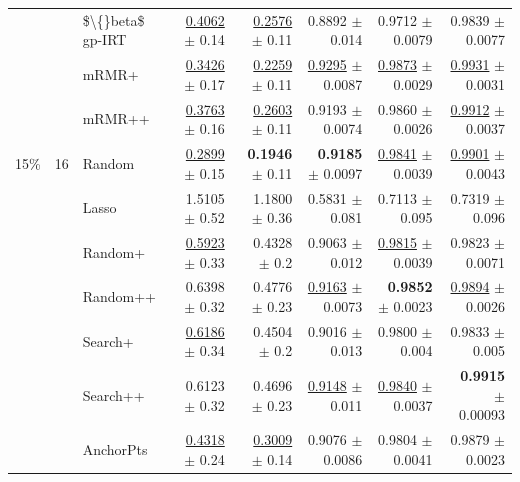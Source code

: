 \begin{longtable}{llp{}rrrrr}
 &  & \$\textbackslash\{\}beta\$ gp-IRT & \underline{0.4062} {\scriptsize $\pm$ 0.14} & \underline{0.2576} {\scriptsize $\pm$ 0.11} & 0.8892 {\scriptsize $\pm$ 0.014} & 0.9712 {\scriptsize $\pm$ 0.0079} & 0.9839 {\scriptsize $\pm$ 0.0077} \\
 &  & mRMR+ & \underline{0.3426} {\scriptsize $\pm$ 0.17} & \underline{0.2259} {\scriptsize $\pm$ 0.11} & \underline{0.9295} {\scriptsize $\pm$ 0.0087} & \underline{0.9873} {\scriptsize $\pm$ 0.0029} & \underline{0.9931} {\scriptsize $\pm$ 0.0031} \\
 &  & mRMR++ & \underline{0.3763} {\scriptsize $\pm$ 0.16} & \underline{0.2603} {\scriptsize $\pm$ 0.11} & 0.9193 {\scriptsize $\pm$ 0.0074} & 0.9860 {\scriptsize $\pm$ 0.0026} & \underline{0.9912} {\scriptsize $\pm$ 0.0037} \\
\midrule
15\% & 16 & Random & \underline{0.2899} {\scriptsize $\pm$ 0.15} & \textbf{0.1946} {\scriptsize $\pm$ 0.11} & \textbf{0.9185} {\scriptsize $\pm$ 0.0097} & \underline{0.9841} {\scriptsize $\pm$ 0.0039} & \underline{0.9901} {\scriptsize $\pm$ 0.0043} \\
 &  & Lasso & 1.5105 {\scriptsize $\pm$ 0.52} & 1.1800 {\scriptsize $\pm$ 0.36} & 0.5831 {\scriptsize $\pm$ 0.081} & 0.7113 {\scriptsize $\pm$ 0.095} & 0.7319 {\scriptsize $\pm$ 0.096} \\
 &  & Random+ & \underline{0.5923} {\scriptsize $\pm$ 0.33} & 0.4328 {\scriptsize $\pm$ 0.2} & 0.9063 {\scriptsize $\pm$ 0.012} & \underline{0.9815} {\scriptsize $\pm$ 0.0039} & 0.9823 {\scriptsize $\pm$ 0.0071} \\
 &  & Random++ & 0.6398 {\scriptsize $\pm$ 0.32} & 0.4776 {\scriptsize $\pm$ 0.23} & \underline{0.9163} {\scriptsize $\pm$ 0.0073} & \textbf{0.9852} {\scriptsize $\pm$ 0.0023} & \underline{0.9894} {\scriptsize $\pm$ 0.0026} \\
 &  & Search+ & \underline{0.6186} {\scriptsize $\pm$ 0.34} & 0.4504 {\scriptsize $\pm$ 0.2} & 0.9016 {\scriptsize $\pm$ 0.013} & 0.9800 {\scriptsize $\pm$ 0.004} & 0.9833 {\scriptsize $\pm$ 0.005} \\
 &  & Search++ & 0.6123 {\scriptsize $\pm$ 0.32} & 0.4696 {\scriptsize $\pm$ 0.23} & \underline{0.9148} {\scriptsize $\pm$ 0.011} & \underline{0.9840} {\scriptsize $\pm$ 0.0037} & \textbf{0.9915} {\scriptsize $\pm$ 0.00093} \\
 &  & AnchorPts & \underline{0.4318} {\scriptsize $\pm$ 0.24} & \underline{0.3009} {\scriptsize $\pm$ 0.14} & 0.9076 {\scriptsize $\pm$ 0.0086} & 0.9804 {\scriptsize $\pm$ 0.0041} & 0.9879 {\scriptsize $\pm$ 0.0023} \\

\end{longtable}
